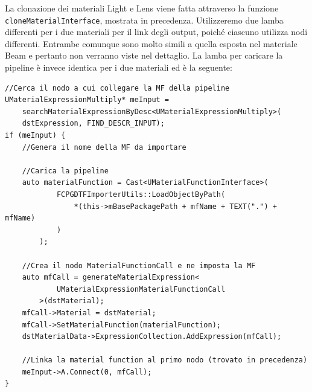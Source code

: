 \documentclass[main.tex]{subfiles}
\begin{document}
\noindent La clonazione dei materiali Light e Lens viene fatta attraverso la funzione \lstinline{cloneMaterialInterface}, mostrata in precedenza. Utilizzeremo due lamba differenti per i due materiali per il link degli output, poiché ciascuno utilizza nodi differenti. Entrambe comunque sono molto simili a quella esposta nel materiale Beam e pertanto non verranno viste nel dettaglio. La lamba per caricare la pipeline è invece identica per i due materiali ed è la seguente:
\begin{lstlisting}
//Cerca il nodo a cui collegare la MF della pipeline
UMaterialExpressionMultiply* meInput =
    searchMaterialExpressionByDesc<UMaterialExpressionMultiply>(
    dstExpression, FIND_DESCR_INPUT);
if (meInput) {
    //Genera il nome della MF da importare

    //Carica la pipeline
    auto materialFunction = Cast<UMaterialFunctionInterface>(
            FCPGDTFImporterUtils::LoadObjectByPath(
                *(this->mBasePackagePath + mfName + TEXT(".") + mfName)
            )
        );

    //Crea il nodo MaterialFunctionCall e ne imposta la MF
    auto mfCall = generateMaterialExpression<
            UMaterialExpressionMaterialFunctionCall
        >(dstMaterial);
    mfCall->Material = dstMaterial;
    mfCall->SetMaterialFunction(materialFunction);
    dstMaterialData->ExpressionCollection.AddExpression(mfCall);

    //Linka la material function al primo nodo (trovato in precedenza)
    meInput->A.Connect(0, mfCall);
}
\end{lstlisting}
\end{document}
